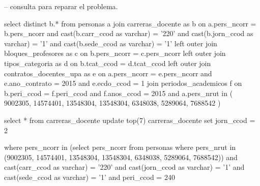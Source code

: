 -- consulta para reparar el problema.

select distinct b.*
from   personas a 
       join carreras_docente as b 
         on a.pers_ncorr = b.pers_ncorr 
            and cast(b.carr_ccod as varchar) = '220' 
            and cast(b.jorn_ccod as varchar) = '1' 
            and cast(b.sede_ccod as varchar) = '1' 
       left outer join bloques_profesores as c 
                    on b.pers_ncorr = c.pers_ncorr 
       left outer join tipos_categoria as d 
                    on b.tcat_ccod = d.tcat_ccod 
       left outer join contratos_docentes_upa as e 
                    on a.pers_ncorr = e.pers_ncorr 
                       and e.ano_contrato = 2015 
                       and e.ecdo_ccod = 1 
       join periodos_academicos f 
         on b.peri_ccod = f.peri_ccod 
            and f.anos_ccod = 2015 
and a.pers_nrut in (
9002305,
14574401,
13548304,
13548304,
6348038,
5289064,
7688542
)


select * from carreras_docente 
update top(7) carreras_docente
set jorn_ccod = 2

where pers_ncorr in (select pers_ncorr from personas where pers_nrut in (9002305,
14574401,
13548304,
13548304,
6348038,
5289064,
7688542))
and cast(carr_ccod as varchar) = '220' 
and cast(jorn_ccod as varchar) = '1' 
and cast(sede_ccod as varchar) = '1' 
and peri_ccod = 240

